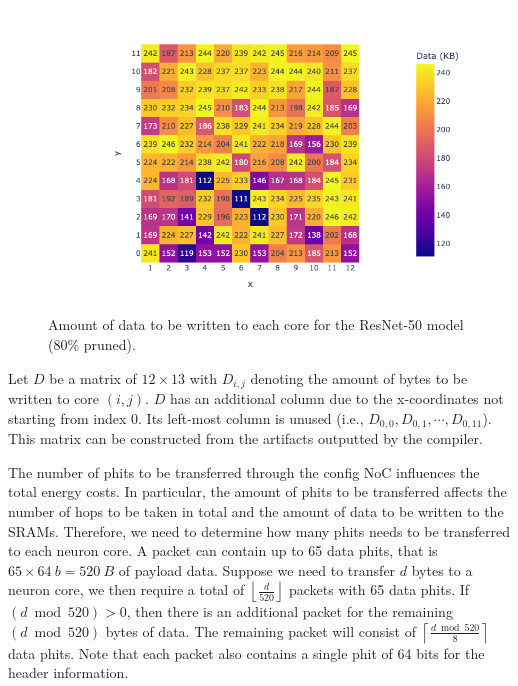 \begin{figure}[hbtp]
    \centering
    \includegraphics[width=0.8\linewidth]{assets/model_data_heatmap.png}
    \caption{Amount of data to be written to each core for the ResNet-50 model (80\% pruned).}
    \label{fig:model_data_heapmap}
\end{figure}

Let $D$ be a matrix of $12 \times 13$ with $D_{i,j}$ denoting the amount of bytes to be written to core $\left( i,j \right)$.
$D$ has an additional column due to the x-coordinates not starting from index $0$.
Its left-most column is unused (i.e., $D_{0,0}, D_{0,1}, \cdots, D_{0,11}$).
This matrix can be constructed from the artifacts outputted by the compiler.

The number of phits to be transferred through the config NoC influences the total energy costs.
In particular, the amount of phits to be transferred affects the number of hops to be taken in total and the amount of data to be written to the SRAMs.
Therefore, we need to determine how many phits needs to be transferred to each neuron core.
A packet can contain up to 65 data phits, that is $65 \times \SI{64}{b} = \SI{520}{B}$ of payload data.
Suppose we need to transfer $d$ bytes to a neuron core, we then require a total of $\left\lfloor \frac{d}{520} \right\rfloor$ packets with 65 data phits.
If $\left( d \bmod 520 \right) > 0$, then there is an additional packet for the remaining $\left( d \bmod 520 \right)$ bytes of data.
The remaining packet will consist of $\left\lceil \frac{d \bmod 520}{8}\right\rceil$ data phits.
Note that each packet also contains a single phit of 64 bits for the header information.

